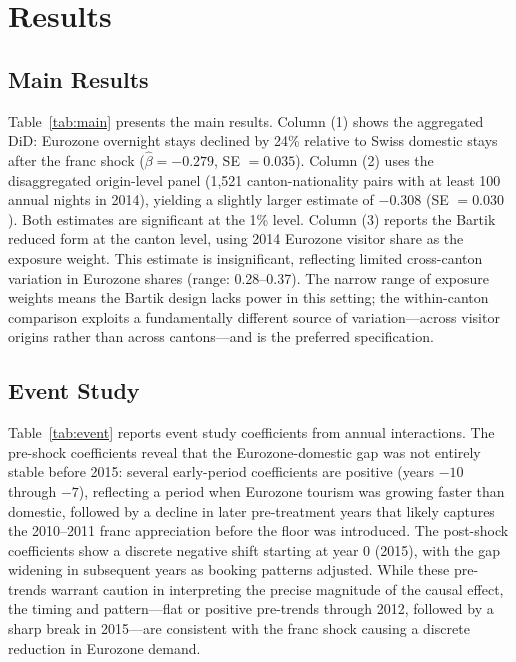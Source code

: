 \documentclass[12pt]{article}
\begin{document}
\section{Results}

\subsection{Main Results}



Table~\ref{tab:main} presents the main results. Column (1) shows the aggregated DiD: Eurozone overnight stays declined by 24\% relative to Swiss domestic stays after the franc shock ($\hat{\beta} = -0.279$, SE $= 0.035$). Column (2) uses the disaggregated origin-level panel (1,521 canton-nationality pairs with at least 100 annual nights in 2014), yielding a slightly larger estimate of $-0.308$ (SE $= 0.030$). Both estimates are significant at the 1\% level. Column (3) reports the Bartik reduced form at the canton level, using 2014 Eurozone visitor share as the exposure weight. This estimate is insignificant, reflecting limited cross-canton variation in Eurozone shares (range: 0.28--0.37). The narrow range of exposure weights means the Bartik design lacks power in this setting; the within-canton comparison exploits a fundamentally different source of variation---across visitor origins rather than across cantons---and is the preferred specification.

\subsection{Event Study}



Table~\ref{tab:event} reports event study coefficients from annual interactions. The pre-shock coefficients reveal that the Eurozone-domestic gap was not entirely stable before 2015: several early-period coefficients are positive (years $-10$ through $-7$), reflecting a period when Eurozone tourism was growing faster than domestic, followed by a decline in later pre-treatment years that likely captures the 2010--2011 franc appreciation before the floor was introduced. The post-shock coefficients show a discrete negative shift starting at year 0 (2015), with the gap widening in subsequent years as booking patterns adjusted. While these pre-trends warrant caution in interpreting the precise magnitude of the causal effect, the timing and pattern---flat or positive pre-trends through 2012, followed by a sharp break in 2015---are consistent with the franc shock causing a discrete reduction in Eurozone demand.
\end{document}
